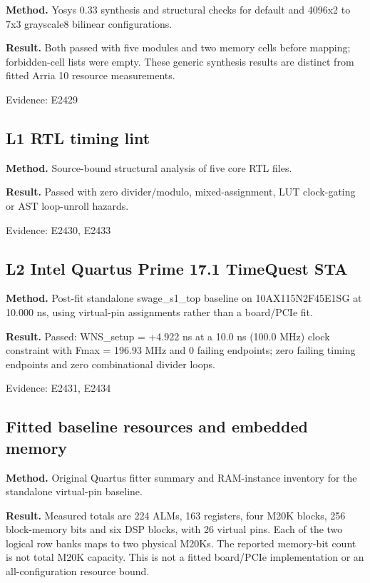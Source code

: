 \documentclass[11pt,a4paper]{article}
\begin{document}
\textbf{Method.} Yosys 0.33 synthesis and structural checks for default and 4096x2 to 7x3 grayscale8 bilinear configurations.

\textbf{Result.} Both passed with five modules and two memory cells before mapping; forbidden-cell lists were empty. These generic synthesis results are distinct from fitted Arria 10 resource measurements.

{\small Evidence: E2429}

\subsection{L1 RTL timing lint}

\textbf{Method.} Source-bound structural analysis of five core RTL files.

\textbf{Result.} Passed with zero divider/\allowbreak{}modulo,\allowbreak{} mixed-assignment,\allowbreak{} LUT clock-gating or AST loop-unroll hazards.

{\small Evidence: E2430,\allowbreak{} E2433}

\subsection{L2 Intel Quartus Prime 17.1 TimeQuest STA}

\textbf{Method.} Post-fit standalone swage\_\allowbreak{}s1\_\allowbreak{}top baseline on 10AX115N2F45E1SG at 10.000 ns,\allowbreak{} using virtual-pin assignments rather than a board/\allowbreak{}PCIe fit.

\textbf{Result.} Passed: WNS\_\allowbreak{}setup =\allowbreak{} +\allowbreak{}4.922 ns at a 10.0 ns (\allowbreak{}100.0 MHz)\allowbreak{} clock constraint with Fmax =\allowbreak{} 196.93 MHz and 0 failing endpoints; zero failing timing endpoints and zero combinational divider loops.

{\small Evidence: E2431,\allowbreak{} E2434}

\subsection{Fitted baseline resources and embedded memory}

\textbf{Method.} Original Quartus fitter summary and RAM-instance inventory for the standalone virtual-pin baseline.

\textbf{Result.} Measured totals are 224 ALMs,\allowbreak{} 163 registers,\allowbreak{} four M20K blocks,\allowbreak{} 256 block-memory bits and six DSP blocks,\allowbreak{} with 26 virtual pins. Each of the two logical row banks maps to two physical M20Ks. The reported memory-bit count is not total M20K capacity. This is not a fitted board/\allowbreak{}PCIe implementation or an all-configuration resource bound.
\end{document}
